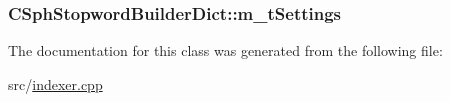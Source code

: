 \hypertarget{classCSphStopwordBuilderDict_a786994cf2ce52279f14776fed031d90b}{
\subsubsection[{m\-\_\-t\-Settings}]{ C\-Sph\-Stopword\-Builder\-Dict\-::m\-\_\-t\-Settings\hspace{0.3cm}{\ttfamily [protected]}}}\label{classCSphStopwordBuilderDict_a786994cf2ce52279f14776fed031d90b}


The documentation for this class was generated from the following file\-:\begin{DoxyCompactItemize}
\item 
src/\hyperlink{indexer_8cpp}{indexer.\-cpp}\end{DoxyCompactItemize}

